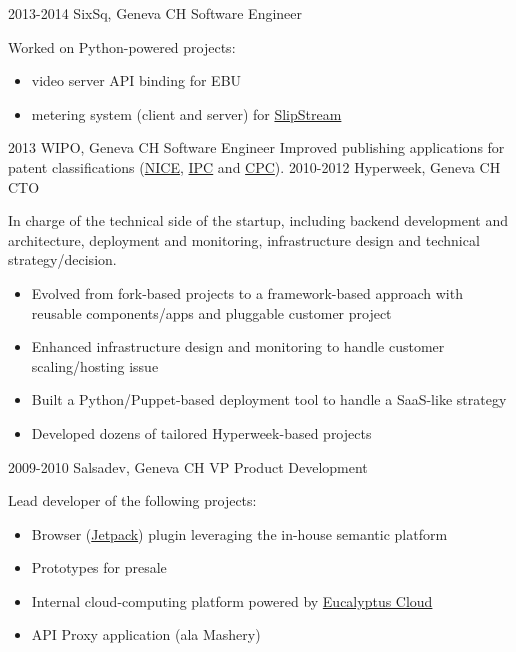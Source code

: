 \documentclass[]{friggeri}
\begin{document}
\clearpage

\begin{entrylist}
  \entry
    {2013-2014}
    {SixSq, Geneva CH}
    {Software Engineer}
    {Worked on Python-powered projects:
    \begin{itemize}
    \item video server API binding for \ac{EBU}
    \item metering system (client and server) for
    \href{http://sixsq.com/products/slipstream.html}{SlipStream{\texttrademark}}
    \end{itemize}}
  \entry
    {2013}
    {\ac{WIPO}, Geneva CH}
    {Software Engineer}
    {Improved publishing applications for patent classifications
    (\href{https://www.wipo.int/classifications/nice/en/}{NICE},
    \href{https://www.wipo.int/classifications/ipc/en/}{IPC} and
    \href{https://www.cooperativepatentclassification.org/home}{CPC}).}
  \entry
    {2010-2012}
    {Hyperweek, Geneva CH}
    {\ac{CTO}}
    {In charge of the technical side of the startup, including
    backend development and architecture, deployment and monitoring,
    infrastructure design and technical strategy/decision.
    \begin{itemize}
    \item Evolved from fork-based projects to a framework-based approach with
    reusable components/apps and pluggable customer project
    \item Enhanced infrastructure design and monitoring to handle customer
    scaling/hosting issue
    \item Built a Python/Puppet-based deployment tool to handle a SaaS-like
    strategy
    \item Developed dozens of tailored Hyperweek-based projects
    \end{itemize}}
  \entry
    {2009-2010}
    {Salsadev, Geneva CH}
    {VP Product Development}
    {Lead developer of the following projects:
    \begin{itemize}
    \item Browser (\href{https://en.wikipedia.org/wiki/Jetpack_(Firefox_project)}{Jetpack})
        plugin leveraging the in-house semantic platform
    \item Prototypes for presale
    \item Internal cloud-computing platform powered by
        \href{https://github.com/eucalyptus/eucalyptus}{Eucalyptus Cloud}
    \item \ac{API} Proxy application (ala Mashery)

\end{itemize}}
\end{entrylist}
\end{document}
